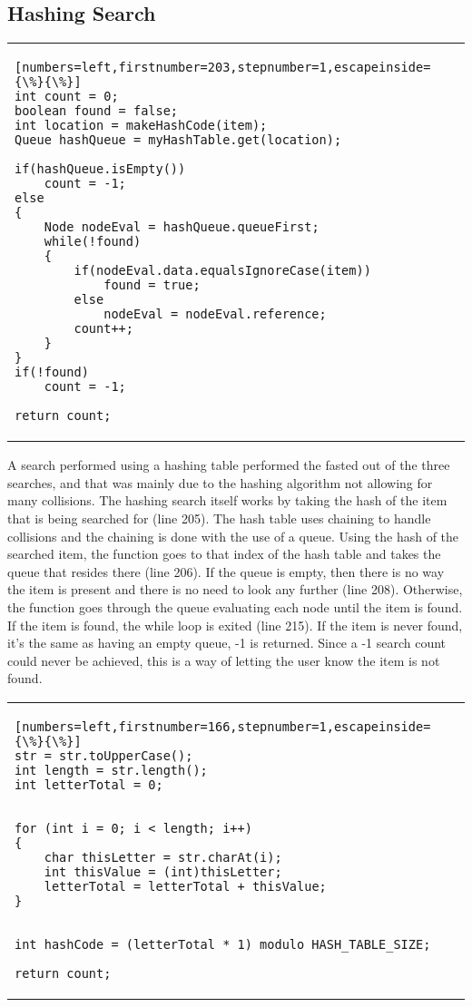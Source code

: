 \documentclass[letterpaper, 10pt,DIV=13]{scrartcl}
\numberwithin{equation}{section} %
\numberwithin{figure}{section} %
\numberwithin{table}{section} %
\begin{document}
\subsection{Hashing Search}

\begin{center}
\begin{tabular}{l}
\begin{lstlisting}[numbers=left,firstnumber=203,stepnumber=1,escapeinside={\%}{\%}]
int count = 0;
boolean found = false;
int location = makeHashCode(item);
Queue hashQueue = myHashTable.get(location);

if(hashQueue.isEmpty())
    count = -1;
else
{
    Node nodeEval = hashQueue.queueFirst;
    while(!found)
    {
        if(nodeEval.data.equalsIgnoreCase(item))
            found = true;
        else
            nodeEval = nodeEval.reference;
        count++;
    }
}
if(!found)
    count = -1;  
        
return count;
\end{lstlisting}
\end{tabular}
\end{center}\textbf{}

A search performed using a hashing table performed the fasted out of the three searches, and that was mainly due to the hashing algorithm not allowing for many collisions.  The hashing search itself works by taking the hash of the item that is being searched for (line 205).  The hash table uses chaining to handle collisions and the chaining is done with the use of a queue.  Using the hash of the searched item, the function goes to that index of the hash table and takes the queue that resides there (line 206).  If the queue is empty, then there is no way the item is present and there is no need to look any further (line 208).  Otherwise, the function goes through the queue evaluating each node until the item is found.  If the item is found, the while loop is exited (line 215).  If the item is never found, it's the same as having an empty queue, -1 is returned.  Since a -1 search count could never be achieved, this is a way of letting the user know the item is not found.

\begin{center}
\begin{tabular}{l}
\begin{lstlisting}[numbers=left,firstnumber=166,stepnumber=1,escapeinside={\%}{\%}]
str = str.toUpperCase();
int length = str.length();
int letterTotal = 0;


for (int i = 0; i < length; i++)
{
    char thisLetter = str.charAt(i);
    int thisValue = (int)thisLetter;
    letterTotal = letterTotal + thisValue;
}


int hashCode = (letterTotal * 1) modulo HASH_TABLE_SIZE;
        
return count;
\end{lstlisting}
\end{tabular}
\end{center}\textbf{}
\end{document}
